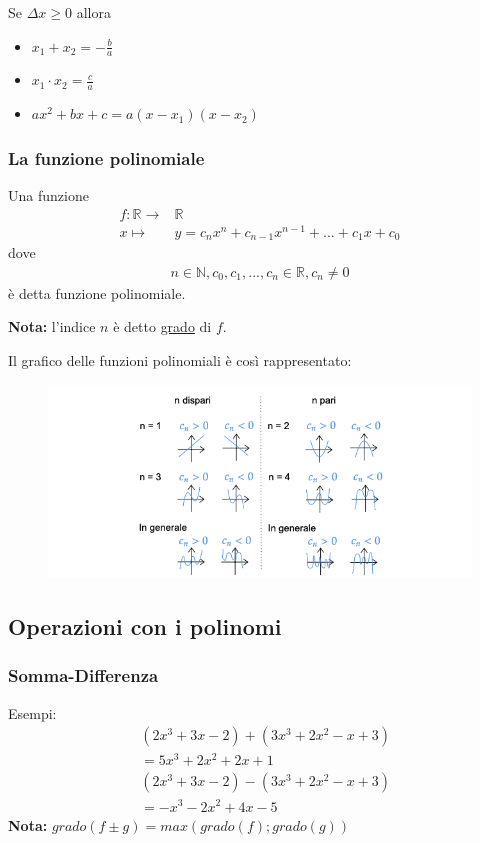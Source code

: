 \documentclass[../main.tex]{subfiles}
\begin{document}
Se $\Delta x \geq 0$ allora
\begin{itemize}
    \item $x_1 + x_2 = -\frac{b}{a}$
    \item $x_1 \cdot x_2 = \frac{c}{a}$
    \item $ax^2+bx+c = a(x-x_1)(x-x_2)$
\end{itemize}

\pagebreak
\subsubsection{La funzione polinomiale}
Una funzione
\begin{align*}
    f:\mathbb{R} \longrightarrow& \mathbb{R} \\
    x \longmapsto& y = c_nx^n + c_{n-1}x^{n-1} + ... + c_1x + c_0
\end{align*}
dove
\begin{align*}
    n \in \mathbb{N}, c_0,c_1, ..., c_n \in \mathbb{R}, c_n \neq 0
\end{align*}
è detta funzione polinomiale.

\textbf{Nota:} l'indice $n$ è detto \underline{grado} di $f$.

\vspace{1.5cm}
Il grafico delle funzioni polinomiali è così rappresentato:
\begin{figure}[h]
    \centering
    \includegraphics[width=1\textwidth]{images/funzioniPolinomiali.png}
\end{figure}

\pagebreak
\subsection{Operazioni con i polinomi}
\subsubsection{Somma-Differenza}
Esempi:
\begin{align*}
    &(2x^3 + 3x -2) + (3x^3 + 2x^2 -x + 3) \\
    &= 5x^3 + 2x^2 + 2x + 1
\end{align*}
\begin{align*}
    &(2x^3 + 3x -2) - (3x^3 + 2x^2 -x + 3) \\
    &= -x^3 -2x^2 + 4 x - 5 
\end{align*}
\textbf{Nota:} $grado(f\pm g) = max(grado(f);grado(g))$
\end{document}
